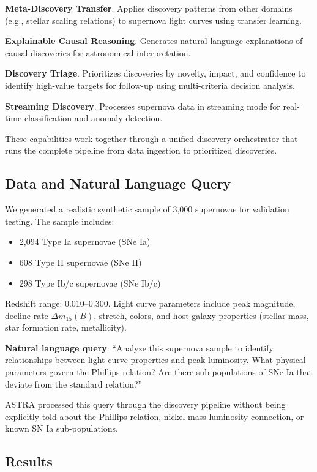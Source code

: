 \documentclass[usenatbib]{rasti}
\begin{document}
\noindent\textbf{Meta-Discovery Transfer}. Applies discovery patterns from other domains (e.g., stellar scaling relations) to supernova light curves using transfer learning.

\noindent\textbf{Explainable Causal Reasoning}. Generates natural language explanations of causal discoveries for astronomical interpretation.

\noindent\textbf{Discovery Triage}. Prioritizes discoveries by novelty, impact, and confidence to identify high-value targets for follow-up using multi-criteria decision analysis.

\noindent\textbf{Streaming Discovery}. Processes supernova data in streaming mode for real-time classification and anomaly detection.

These capabilities work together through a unified discovery orchestrator that runs the complete pipeline from data ingestion to prioritized discoveries.

\subsection{Data and Natural Language Query}

We generated a realistic synthetic sample of 3,000 supernovae for validation testing. The sample includes:
\begin{itemize}
\item 2,094 Type Ia supernovae (SNe Ia)
\item 608 Type II supernovae (SNe II)
\item 298 Type Ib/c supernovae (SNe Ib/c)
\end{itemize}
Redshift range: 0.010--0.300. Light curve parameters include peak magnitude, decline rate $\Delta m_{15}(B)$, stretch, colors, and host galaxy properties (stellar mass, star formation rate, metallicity).

\textbf{Natural language query}: ``Analyze this supernova sample to identify relationships between light curve properties and peak luminosity. What physical parameters govern the Phillips relation? Are there sub-populations of SNe Ia that deviate from the standard relation?''

ASTRA processed this query through the discovery pipeline without being explicitly told about the Phillips relation, nickel mass-luminosity connection, or known SN Ia sub-populations.

\subsection{Results}
\end{document}
